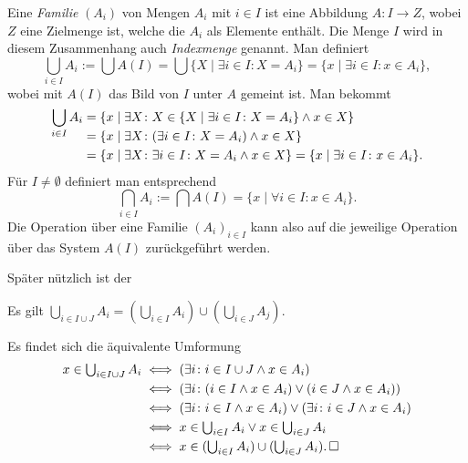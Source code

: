 Eine \emph{Familie} $(A_i)$ von Mengen $A_i$ mit $i\in I$
ist eine Abbildung $A\colon I\to Z$, wobei $Z$ eine Zielmenge ist,
welche die $A_i$ als Elemente enthält. Die Menge $I$ wird in diesem
Zusammenhang auch \emph{Indexmenge} genannt. Man
definiert%
\[\bigcup_{i\in I} A_i := \bigcup A(I)
= \bigcup\{X\mid\exists i\in I\colon X=A_i\} = \{x\mid\exists i\in I\colon x\in A_i\},\]
wobei mit $A(I)$ das Bild von $I$ unter $A$ gemeint ist. Man bekommt%
\begin{align*}
\smash{\bigcup_{i\in I} A_i}
&= \{x\mid\exists X\colon X\in \{X\mid\exists i\in I\colon X=A_i\}\land x\in X\}\\
&= \{x\mid\exists X\colon (\exists i\in I\colon X=A_i)\land x\in X\}\\
&= \{x\mid\exists X\colon \exists i\in I\colon X=A_i\land x\in X\}
= \{x\mid\exists i\in I\colon x\in A_i\}.
\end{align*}
Für $I\ne\emptyset$ definiert man entsprechend
\[\bigcap_{i\in I} A_i := \bigcap A(I) = \{x\mid\forall i\in I\colon x\in A_i\}.\]
Die Operation über eine Familie $(A_i)_{i\in I}$ kann also
auf die jeweilige Operation über das System $A(I)$ zurückgeführt
werden.

Später nützlich ist der

\begin{Satz}\label{Index-in-Schnitt}
Es gilt $\bigcup_{i\in I\cup J} A_i = (\bigcup_{i\in I} A_i)\cup
(\bigcup_{i\in J} A_j)$.
\end{Satz}
\begin{Beweis}
Es findet sich die äquivalente Umformung
\begin{align*}\textstyle
x\in\bigcup_{i\in I\cup J} A_i &\iff (\exists i\colon i\in I\cup J\land x\in A_i)\\
&\iff(\exists i\colon (i\in I\land x\in A_i)\lor (i\in J\land x\in A_i))\\
&\iff(\exists i\colon i\in I\land x\in A_i)\lor (\exists i\colon i\in J\land x\in A_i)\\
&\iff\textstyle x\in\bigcup_{i\in I} A_i\lor x\in\bigcup_{i\in J} A_i\\
&\iff\textstyle x\in(\bigcup_{i\in I} A_i)\cup (\bigcup_{i\in J} A_i).\,\Box
\end{align*}
\end{Beweis}

